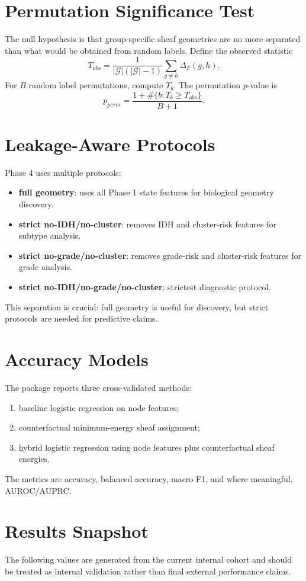 \documentclass[11pt]{article}
\begin{document}
\section{Permutation Significance Test}
The null hypothesis is that group-specific sheaf geometries are no more separated than what would be obtained from random labels. Define the observed statistic
\[
  T_{obs}=\frac{1}{|\mathcal{G}|(|\mathcal{G}|-1)}
  \sum_{g\ne h}\Delta_F(g,h).
\]
For $B$ random label permutations, compute $T_b$. The permutation $p$-value is
\[
  p_{perm}=\frac{1+\#\{b:T_b\ge T_{obs}\}}{B+1}.
\]

\section{Leakage-Aware Protocols}
Phase 4 uses multiple protocols:
\begin{itemize}[leftmargin=1.5em]
\item \textbf{full geometry}: uses all Phase 1 state features for biological geometry discovery.
\item \textbf{strict no-IDH/no-cluster}: removes IDH and cluster-risk features for subtype analysis.
\item \textbf{strict no-grade/no-cluster}: removes grade-risk and cluster-risk features for grade analysis.
\item \textbf{strict no-IDH/no-grade/no-cluster}: strictest diagnostic protocol.
\end{itemize}
This separation is crucial: full geometry is useful for discovery, but strict protocols are needed for predictive claims.

\section{Accuracy Models}
The package reports three cross-validated methods:
\begin{enumerate}[leftmargin=1.5em]
\item baseline logistic regression on node features;
\item counterfactual minimum-energy sheaf assignment;
\item hybrid logistic regression using node features plus counterfactual sheaf energies.
\end{enumerate}
The metrics are accuracy, balanced accuracy, macro F1, and where meaningful, AUROC/AUPRC.

\section{Results Snapshot}
The following values are generated from the current internal cohort and should be treated as internal validation rather than final external performance claims.
\end{document}

